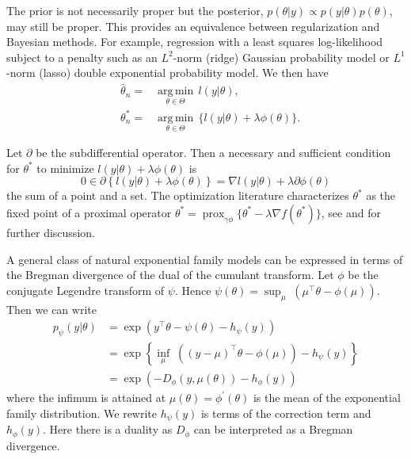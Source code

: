 \documentclass[12pt]{TD-CJS}
\newcommand{\prox}{ \mathop{\mathrm{prox}} }
\DeclareMathOperator*{\argmin}{arg\,min}
\begin{document}
The prior is not necessarily proper but the posterior, $p(\theta | y) \propto p(y | \theta) p(\theta)$, may still be proper. This provides an equivalence between regularization and Bayesian methods. For example, regression with a least squares log-likelihood subject to a penalty such as an $L^2$-norm (ridge) Gaussian probability model or $ L^1$-norm (lasso) double exponential probability model. We then have
\begin{eqnarray}
&\hat\theta_n =& \underset{\theta \in \Theta}{\argmin}\, l(y|\theta),\\
&\theta^*_n =& \underset{\theta \in \Theta}{\argmin}\,  \{ l(y|\theta) + \lambda\phi(\theta) \}.  \label{posterior mode}
\end{eqnarray}

Let $\partial$ be the subdifferential operator.  Then a necessary and sufficient condition for $\theta^*$ to minimize $ l(y|\theta) + \lambda\phi(\theta)$  is 
\begin{equation}
\label{eqn:subdiffproxgrad}
0 \in \partial \left\{ l(y|\theta) + \lambda\phi(\theta)\right\} = \nabla l(y|\theta) + \lambda\partial \phi(\theta) 
\end{equation}
the sum of a point and a set.  The optimization literature  characterizes $\theta^*$ as the fixed point of a proximal operator
$\theta^* = \prox_{\gamma \phi}\{ \theta^* - \lambda \nabla f(\theta^*) \} $, see \cite{polson2015mixtures} and \cite*{polson2015proximal} for further discussion. 

A general class of natural exponential family models can be expressed in terms of the Bregman divergence of the dual of the cumulant transform.
Let $ \phi $ be the conjugate Legendre transform of $\psi$. Hence $ \psi(\theta) = \sup_\mu \; \left ( \mu^\top \theta - \phi(\mu) \right )$. Then we can write
\begin{align*}
p_\psi ( y | \theta ) & = \exp \left ( y^\top \theta - \psi( \theta) - h_\psi(y) \right )\\
 & = \exp \left \{ \inf_\mu \; \left ( ( y - \mu )^\top \theta - \phi(\mu) \right ) - h_\psi(y) \right \}\\
& = \exp \left ( - D_\phi ( y , \mu(\theta) ) - h_\phi (y) \right )
\end{align*}
where the infimum is attained at $ \mu(\theta) = \phi^\prime (\theta) $ is the mean of the exponential family distribution. 
We rewrite $ h_\psi(y) $ is terms of the correction term and $ h_\phi(y)$. Here there is a duality as $D_\phi$ can be interpreted as a Bregman divergence. 
\end{document}
